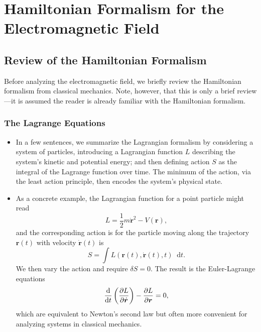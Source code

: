 \documentclass[11pt, a4paper]{article}
\newcommand{\diff}{\mathop{}\!\mathrm{d}} %
\renewcommand{\vec}[1]{\bm{#1}} %
\renewcommand{\r}{\vec{r}}
\begin{document}
\newpage
\section{Hamiltonian Formalism for the Electromagnetic Field}

\subsection{Review of the Hamiltonian Formalism}
Before analyzing the electromagnetic field, we briefly review the Hamiltonian formalism from classical mechanics. Note, however, that this is only a brief review---it is assumed the reader is already familiar with the Hamiltonian formalism.

\subsubsection{The Lagrange Equations}
\begin{itemize}
    \item In a few sentences, we summarize the Lagrangian formalism by considering a system of particles, introducing a Lagrangian function $ L $ describing the system's kinetic and potential energy; and then defining action $ S $ as the integral of the Lagrange function over time. The minimum of the action, via the least action principle, then encodes the system's physical state.

    \item As a concrete example, the Lagrangian function for a point particle might read
    \begin{equation*}
        L = \frac{1}{2}m \dot{\vec{r}}^{2} - V(\r),
    \end{equation*}
    and the corresponding action is for the particle moving along the trajectory $ \r(t) $ with velocity $ \dot{\r}(t) $ is
    \begin{equation*}
        S = \int L(\r(t), \dot{\r}(t), t)\diff t.
    \end{equation*}
    We then vary the action and require $ \delta S = 0 $. The result is the Euler-Lagrange equations
    \begin{align*}
        \dv{t} \left(\pdv{L}{\dot{\r}} \right) - \pdv{L}{\r} = 0,
    \end{align*}
    which are equivalent to Newton's second law but often more convenient for analyzing systems in classical mechanics.

\end{itemize}
\end{document}
